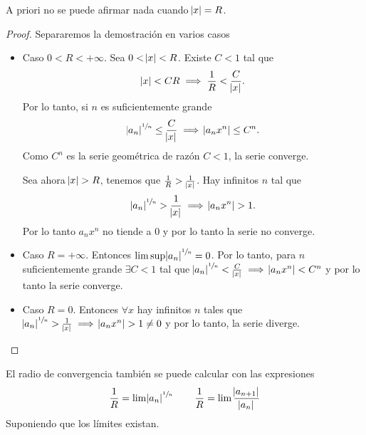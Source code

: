 \begin{obs}
    A priori no se puede afirmar nada cuando $\abs{x} = R$.
\end{obs}

\begin{proof}
    Separaremos la demostración en varios casos
    \begin{itemize}
        \item Caso $0 < R < + \infty$. Sea $0 < \abs{x} < R$. Existe $C < 1$ tal que
             \[
                \abs{x} < CR \implies \frac{1}{R} < \frac{C}{\abs{x}}.
            \]
            Por lo tanto, si $n$ es suficientemente grande
            \[
                \abs{a_n}^{\sfrac{1}{n}} \leq \frac{C}{\abs{x}} \implies
                \abs{a_nx^n} \leq C^n.
            \]
            Como $C^n$ es la serie geométrica de razón $C < 1$, la serie converge.

            Sea ahora $\abs{x} > R$, tenemos que $\frac{1}{R} > \frac{1}{\abs{x}}$.
            Hay infinitos $n$ tal que
            \[
                \abs{a_n}^{\sfrac{1}{n}} > \frac{1}{\abs{x}} \implies \abs{a_nx^n} > 1.
            \]
            Por lo tanto $a_nx^n$ no tiende a 0 y por lo tanto la serie no converge.
        \item Caso $R = +\infty$. Entonces $\limsup \abs{a_n}^{\sfrac{1}{n}} = 0$.
            Por lo tanto, para $n$ suficientemente grande $\exists C < 1$ tal que
            $\abs{a_n}^{\sfrac{1}{n}} < \frac{C}{\abs{x}} \implies \abs{a_nx^n} < C^n$ y por lo tanto
            la serie converge.
        \item Caso $R = 0$. Entonces $\forall x$ hay infinitos $n$ tales que
             $\abs{a_n}^{\sfrac{1}{n}} > \frac{1}{\abs{x}} \implies \abs{a_nx^n} > 1 \neq 0$
            y por lo tanto, la serie diverge.
    \end{itemize}
\end{proof}

\begin{obs}
    El radio de convergencia también se puede calcular con las expresiones
    \[
        \frac{1}{R} = \lim \abs{a_n}^{\sfrac{1}{n}} \qquad
        \frac{1}{R} = \lim \frac{\abs{a_{n+1}}}{\abs{a_n}}
    \]
    Suponiendo que los límites existan.
\end{obs}

